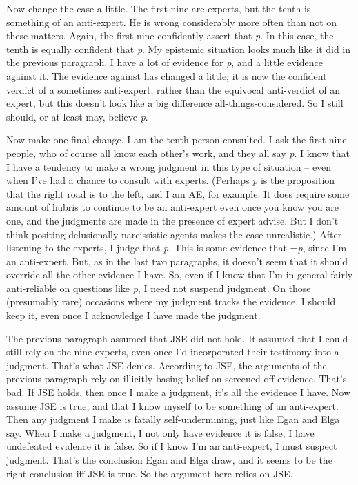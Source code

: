 \documentclass[
  11pt,
  letterpaper,
  DIV=11,
  numbers=noendperiod,
  twoside]{scrartcl}
\begin{document}
Now change the case a little. The first nine are experts, but the tenth
is something of an anti-expert. He is wrong considerably more often than
not on these matters. Again, the first nine confidently assert that
\emph{p}. In this case, the tenth is equally confident that \emph{p}. My
epistemic situation looks much like it did in the previous paragraph. I
have a lot of evidence for \emph{p}, and a little evidence against it.
The evidence against has changed a little; it is now the confident
verdict of a sometimes anti-expert, rather than the equivocal
anti-verdict of an expert, but this doesn't look like a big difference
all-things-considered. So I still should, or at least may, believe
\emph{p}.

Now make one final change. I am the tenth person consulted. I ask the
first nine people, who of course all know each other's work, and they
all say \emph{p}. I know that I have a tendency to make a wrong judgment
in this type of situation -- even when I've had a chance to consult with
experts. (Perhaps \emph{p} is the proposition that the right road is to
the left, and I am AE, for example. It does require some amount of
hubris to continue to be an anti-expert even once you know you are one,
and the judgments are made in the presence of expert advise. But I don't
think positing delusionally narcissistic agents makes the case
unrealistic.) After listening to the experts, I judge that \emph{p}.
This is some evidence that ¬\emph{p}, since I'm an anti-expert. But, as
in the last two paragraphs, it doesn't seem that it should override all
the other evidence I have. So, even if I know that I'm in general fairly
anti-reliable on questions like \emph{p}, I need not suspend judgment.
On those (presumably rare) occasions where my judgment tracks the
evidence, I should keep it, even once I acknowledge I have made the
judgment.

The previous paragraph assumed that JSE did not hold. It assumed that I
could still rely on the nine experts, even once I'd incorporated their
testimony into a judgment. That's what JSE denies. According to JSE, the
arguments of the previous paragraph rely on illicitly basing belief on
screened-off evidence. That's bad. If JSE holds, then once I make a
judgment, it's all the evidence I have. Now assume JSE is true, and that
I know myself to be something of an anti-expert. Then any judgment I
make is fatally self-undermining, just like Egan and Elga say. When I
make a judgment, I not only have evidence it is false, I have undefeated
evidence it is false. So if I know I'm an anti-expert, I must suspect
judgment. That's the conclusion Egan and Elga draw, and it seems to be
the right conclusion iff JSE is true. So the argument here relies on
JSE.
\end{document}

